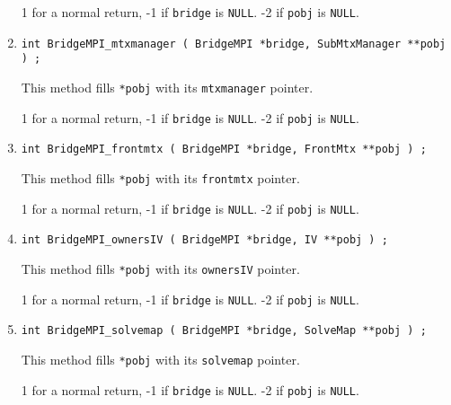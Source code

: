 \begin{enumerate}
\par {}
1 for a normal return, 
-1 if \texttt{bridge} is \texttt{NULL}.
-2 if \texttt{pobj} is \texttt{NULL}.
\item
\begin{verbatim}
int BridgeMPI_mtxmanager ( BridgeMPI *bridge, SubMtxManager **pobj ) ;
\end{verbatim}
This method fills \texttt{*pobj} with its \texttt{mtxmanager} pointer.
\par {}
1 for a normal return, 
-1 if \texttt{bridge} is \texttt{NULL}.
-2 if \texttt{pobj} is \texttt{NULL}.
\item
\begin{verbatim}
int BridgeMPI_frontmtx ( BridgeMPI *bridge, FrontMtx **pobj ) ;
\end{verbatim}
This method fills \texttt{*pobj} with its \texttt{frontmtx} pointer.
\par {}
1 for a normal return, 
-1 if \texttt{bridge} is \texttt{NULL}.
-2 if \texttt{pobj} is \texttt{NULL}.
\item
\begin{verbatim}
int BridgeMPI_ownersIV ( BridgeMPI *bridge, IV **pobj ) ;
\end{verbatim}
This method fills \texttt{*pobj} with its \texttt{ownersIV} pointer.
\par {}
1 for a normal return, 
-1 if \texttt{bridge} is \texttt{NULL}.
-2 if \texttt{pobj} is \texttt{NULL}.
\item
\begin{verbatim}
int BridgeMPI_solvemap ( BridgeMPI *bridge, SolveMap **pobj ) ;
\end{verbatim}
This method fills \texttt{*pobj} with its \texttt{solvemap} pointer.
\par {}
1 for a normal return, 
-1 if \texttt{bridge} is \texttt{NULL}.
-2 if \texttt{pobj} is \texttt{NULL}.

\end{enumerate}
